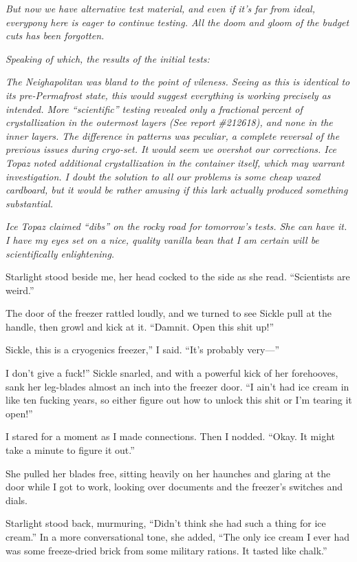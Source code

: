 \textit{But now we have alternative test material, and even if it’s far from ideal, everypony here is eager to continue testing. All the doom and gloom of the budget cuts has been forgotten.}

\textit{Speaking of which, the results of the initial tests:}

\textit{The Neighapolitan was bland to the point of vileness. Seeing as this is identical to its pre-Permafrost state, this would suggest everything is working precisely as intended. More “scientific” testing revealed only a fractional percent of crystallization in the outermost layers (See report \#212618), and none in the inner layers. The difference in patterns was peculiar, a complete reversal of the previous issues during cryo-set. It would seem we overshot our corrections. Ice Topaz noted additional crystallization in the container itself, which may warrant investigation. I doubt the solution to all our problems is some cheap waxed cardboard, but it would be rather amusing if this lark actually produced something substantial.}

\textit{Ice Topaz claimed “dibs” on the rocky road for tomorrow’s tests. She can have it. I have my eyes set on a nice, quality vanilla bean that I am certain will be scientifically enlightening.}

Starlight stood beside me, her head cocked to the side as she read. “Scientists are weird.”

The door of the freezer rattled loudly, and we turned to see Sickle pull at the handle, then growl and kick at it. “Damnit. Open this shit up!”

\leavevmode{}Sickle, this is a cryogenics freezer,” I said. “It’s probably very—”

\leavevmode{}I don’t give a fuck!” Sickle snarled, and with a powerful kick of her forehooves, sank her leg-blades almost an inch into the freezer door. “I ain’t had ice cream in like ten fucking years, so either figure out how to unlock this shit or I’m tearing it open!”

I stared for a moment as I made connections. Then I nodded. “Okay. It might take a minute to figure it out.”

She pulled her blades free, sitting heavily on her haunches and glaring at the door while I got to work, looking over documents and the freezer’s switches and dials.

Starlight stood back, murmuring, “Didn’t think she had such a thing for ice cream.” In a more conversational tone, she added, “The only ice cream I ever had was some freeze-dried brick from some military rations. It tasted like chalk.”

